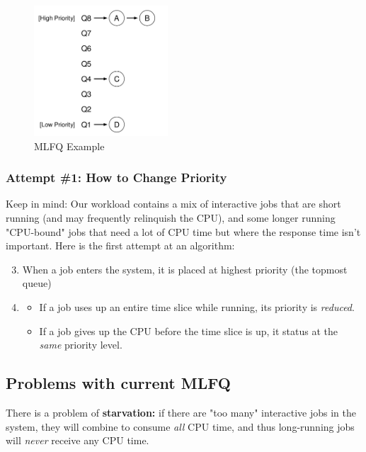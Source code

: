 \begin{figure}[h!]
    \begin{center}
        \includegraphics[width=5cm]{img/81.png}
        \caption{MLFQ Example}
    \end{center}
\end{figure}

\subsubsection{Attempt \#1: How to Change Priority}

Keep in mind: Our workload contains a mix of interactive jobs that are short
running (and may frequently relinquish the CPU), and some longer running
"CPU-bound" jobs that need a lot of CPU time but where the response time
isn't important. Here is the first attempt at an algorithm:

\begin{enumerate}
        \setcounter{enumi}{2}
    \item When a job enters the system, it is placed at highest
        priority (the topmost queue)
    \item 
        \begin{itemize}
            \item If a job uses up an entire time slice while running, 
                its priority is \textit{reduced}.
            \item If a job gives up the CPU before the time slice is up,
                it status at the \textit{same} priority level.
        \end{itemize}
\end{enumerate}

\subsection{Problems with current MLFQ}

There is a problem of \textbf{starvation:} if there are "too many" interactive
jobs in the system, they will combine to consume \textit{all} CPU time, and
thus long-running jobs will \textit{never} receive any CPU time.\\

